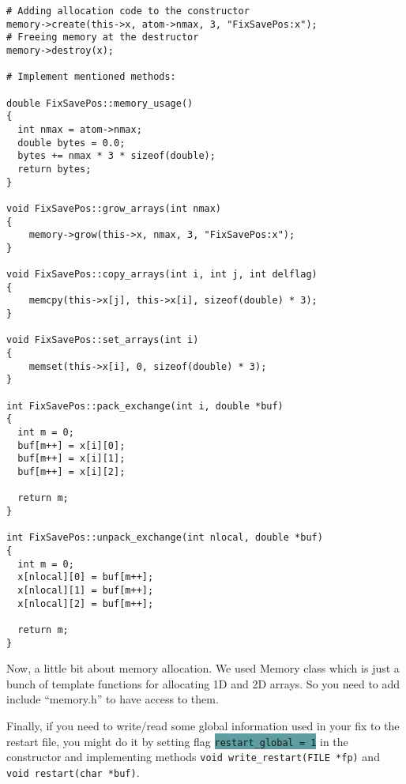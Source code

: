 \documentclass{article}
\newcommand{\code}[1]{\colorbox{cadetblue}{\color{white}\texttt{#1}}}
\begin{document}
\begin{center}
\begin{verbatim}
# Adding allocation code to the constructor
memory->create(this->x, atom->nmax, 3, "FixSavePos:x");
# Freeing memory at the destructor
memory->destroy(x);

# Implement mentioned methods:

double FixSavePos::memory_usage()
{
  int nmax = atom->nmax;
  double bytes = 0.0;
  bytes += nmax * 3 * sizeof(double);
  return bytes;
}

void FixSavePos::grow_arrays(int nmax)
{
    memory->grow(this->x, nmax, 3, "FixSavePos:x");
}

void FixSavePos::copy_arrays(int i, int j, int delflag)
{
    memcpy(this->x[j], this->x[i], sizeof(double) * 3);
}

void FixSavePos::set_arrays(int i)
{
    memset(this->x[i], 0, sizeof(double) * 3);
}

int FixSavePos::pack_exchange(int i, double *buf)
{
  int m = 0;
  buf[m++] = x[i][0];
  buf[m++] = x[i][1];
  buf[m++] = x[i][2];

  return m;
}

int FixSavePos::unpack_exchange(int nlocal, double *buf)
{
  int m = 0;
  x[nlocal][0] = buf[m++];
  x[nlocal][1] = buf[m++];
  x[nlocal][2] = buf[m++];

  return m;
}
\end{verbatim}
\end{center}

Now, a little bit about memory allocation. We used Memory class which
is just a bunch of template functions for allocating 1D and 2D
arrays. So you need to add include ``memory.h'' to have access to them.

Finally, if you need to write/read some global information used in your fix to
the restart file, you might do it by setting flag \code{restart\_global = 1} in
the constructor and implementing methods \texttt{void write\_restart(FILE *fp)} and \texttt{void restart(char *buf)}.
\end{document}

